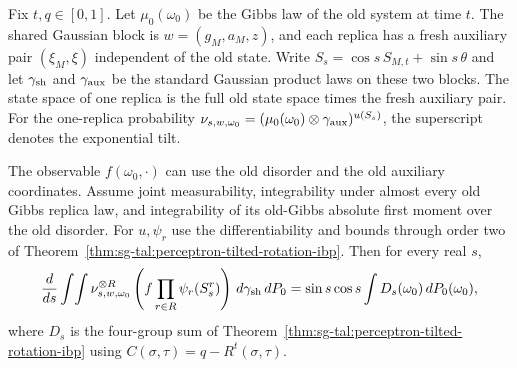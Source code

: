 \begin{theorem}\label{thm:sg-tal:perceptron-split-cavity-rotation}
  \leanok
Fix $t,q\in[0,1]$. Let $\mu_0(\omega_0)$ be the Gibbs law of the old system at time $t$.
The shared Gaussian block is $w=(g_M,a_M,z)$, and each replica has a fresh auxiliary pair
$(\xi_M,\xi)$ independent of the old state. Write $S_s=\cos s\,S_{M,t}+\sin s\,\theta$ and let
$\gamma_{\rm sh}$ and $\gamma_{\rm aux}$ be the standard Gaussian product laws on these two blocks.
The state space of one replica is the full old state space times the fresh auxiliary pair. For
the one-replica probability $\nu_{s,w,\omega_0}=(\mu_0(\omega_0)\otimes
\gamma_{\rm aux})^{u(S_s)}$, the superscript denotes the exponential tilt.

The observable $f(\omega_0,\cdot)$ can use the old disorder and the old auxiliary coordinates.
Assume joint measurability, integrability under almost every old Gibbs replica law, and
integrability of its old-Gibbs absolute first moment over the old disorder. For $u,\psi_r$ use
the differentiability and bounds through order two of
Theorem~\ref{thm:sg-tal:perceptron-tilted-rotation-ibp}. Then for every real $s$,
\[
 \frac{d}{ds}\int\!\int \nu_{s,w,\omega_0}^{\otimes R}
 \left(f\prod_{r\in R}\psi_r(S_s^r)\right)\,d\gamma_{\rm sh}\,dP_0
 =\sin s\cos s\int D_s(\omega_0)\,dP_0(\omega_0),
\]
where $D_s$ is the four-group sum of
Theorem~\ref{thm:sg-tal:perceptron-tilted-rotation-ibp} using $C(\sigma,\tau)=q-R^t(\sigma,\tau)$.
\end{theorem}
